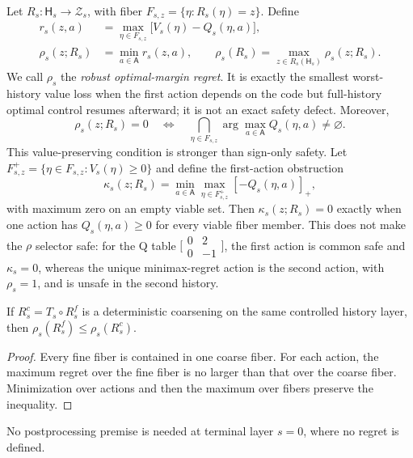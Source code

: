 Let $R_s:\mathsf H_s\to\mathcal Z_s$, with fiber
$F_{s,z}=\{\eta:R_s(\eta)=z\}$.  Define
\begin{align}
 r_s(z,a)&=\max_{\eta\in F_{s,z}}\bigl[V_s(\eta)-Q_s(\eta,a)\bigr],\nonumber\\
 \rho_s(z;R_s)&=\min_{a\in\mathsf A}r_s(z,a),\qquad
 \rho_s(R_s)=\max_{z\in R_s(\mathsf H_s)}\rho_s(z;R_s).
 \label{eq:dynamic-optimal-margin-regret}
\end{align}
We call $\rho_s$ the \emph{robust optimal-margin regret}.  It is exactly the smallest
worst-history value loss when the first action depends on the code but full-history optimal control
resumes afterward; it is not an exact safety defect.  Moreover,
\begin{equation}
 \rho_s(z;R_s)=0
 \quad\Longleftrightarrow\quad
 \bigcap_{\eta\in F_{s,z}}\arg\max_{a\in\mathsf A}Q_s(\eta,a)\neq\varnothing.
 \label{eq:zero-regret-characterization}
\end{equation}
This value-preserving condition is stronger than sign-only safety.  Let
$F_{s,z}^+=\{\eta\in F_{s,z}:V_s(\eta)\geq0\}$ and define the first-action obstruction
\begin{equation}
 \kappa_s(z;R_s)=\min_{a\in\mathsf A}\max_{\eta\in F_{s,z}^+}[-Q_s(\eta,a)]_+,
 \label{eq:first-action-obstruction}
\end{equation}
with maximum zero on an empty viable set.  Then $\kappa_s(z;R_s)=0$ exactly when one action has
$Q_s(\eta,a)\geq0$ for every viable fiber member.  This does not make the $\rho$ selector safe:
for the Q table
$\bigl[\begin{smallmatrix}0&2\\0&-1\end{smallmatrix}\bigr]$, the first action is common safe and
$\kappa_s=0$, whereas the unique minimax-regret action is the second action, with $\rho_s=1$, and
is unsafe in the second history.

\begin{proposition}
\label{prop:dynamic-data-processing}
If $R_s^c=T_s\circ R_s^f$ is a deterministic coarsening on the same controlled history layer, then
$\rho_s(R_s^f)\leq\rho_s(R_s^c)$.
\end{proposition}

\begin{proof}
Every fine fiber is contained in one coarse fiber.  For each action, the maximum regret over the
fine fiber is no larger than that over the coarse fiber.  Minimization over actions and then the
maximum over fibers preserve the inequality.
\end{proof}
No postprocessing premise is needed at terminal layer $s=0$, where no regret is defined.

